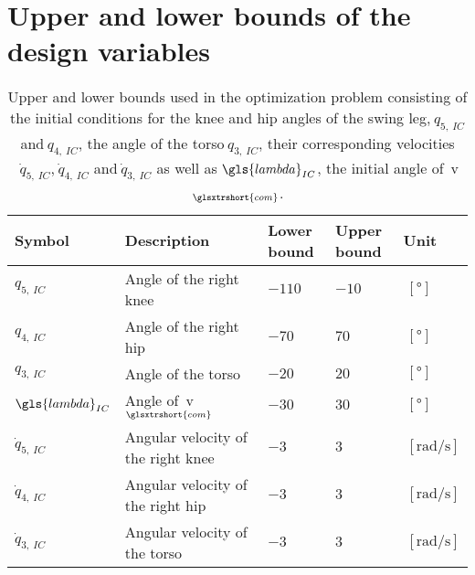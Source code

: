 \chapter{Upper and lower bounds of the design variables}%
\label{app:A}


\begin{table}[H]
    \caption{Upper and lower bounds used in the optimization problem consisting of the initial conditions for the knee and hip angles of the swing leg,$~q_{5,~IC}$ and$~q_{4,~IC}$, the angle of the torso$~q_{3,~IC}$, their corresponding velocities$~\dot{q}_{5,~IC}$,$~\dot{q}_{4,~IC}$ and$~\dot{q}_{3,~IC}$ as well as$~\gls{lambda}_{IC}$, the initial angle of~\gls{v}$_{\glsxtrshort{com}}$.} 
    \label{tab:upper-and-lower-bounds}
    \begin{center}
        \begin{tabular}{ l|l|l|l|l }
            \textbf{Symbol}                 & \textbf{Description}                      & \textbf{Lower bound}  & \textbf{Upper bound}  & \textbf{Unit}                          \\ [0.5ex]
            \hline \hline
            $q_{5,~IC}$               & Angle of the right knee                   & $-110$                & $-10$                 &$~\left[\si{\degree}\right]$            \\
            $q_{4,~IC}$               & Angle of the right hip                    & $-70$                 & $70$                  &$~\left[\si{\degree}\right]$            \\
            $q_{3,~IC}$               & Angle of the torso                        & $-20$                 & $20$                  &$~\left[\si{\degree}\right]$            \\
            $\gls{lambda}_{IC}$             & Angle of~\gls{v}$_{\glsxtrshort{com}}$    & $-30$                 & $30$                  &$~\left[\si{\degree}\right]$            \\
            $\dot{q}_{5,~IC}$         & Angular velocity of the right knee        & $-3$                  & $3$                   &$~\left[\si{\radian\per\second}\right]$ \\
            $\dot{q}_{4,~IC}$         & Angular velocity of the right hip         & $-3$                  & $3$                   &$~\left[\si{\radian\per\second}\right]$ \\
            $\dot{q}_{3,~IC}$         & Angular velocity of the torso             & $-3$                  & $3$                   &$~\left[\si{\radian\per\second}\right]$ \\
        \end{tabular}
    \end{center}
\end{table}
%

